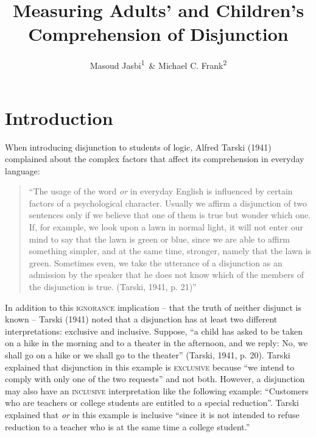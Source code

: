 \documentclass[,man,floatsintext]{apa6}
\title{Measuring Adults' and Children's Comprehension of Disjunction}
\author{Masoud Jasbi\textsuperscript{1}~\& Michael C. Frank\textsuperscript{2}}
\date{}
\affiliation{
\vspace{0.5cm}
\textsuperscript{1} Harvard University\\\textsuperscript{2} Stanford University}
\begin{document}
\maketitle

\hypertarget{introduction}{%
\section{Introduction}\label{introduction}}

When introducing disjunction to students of logic, Alfred Tarski (1941) complained about the complex factors that affect its comprehension in everyday language:

\begin{quote}
\enquote{The usage of the word \emph{or} in everyday English is influenced by certain factors of a psychological character. Usually we affirm a disjunction of two sentences only if we believe that one of them is true but wonder which one. If, for example, we look upon a lawn in normal light, it will not enter our mind to say that the lawn is green or blue, since we are able to affirm something simpler, and at the same time, stronger, namely that the lawn is green. Sometimes even, we take the utterance of a disjunction as an admission by the speaker that he does not know which of the members of the disjunction is true. (Tarski, 1941, p. 21)}
\end{quote}

In addition to this \textsc{ignorance} implication -- that the truth of neither disjunct is known -- Tarski (1941) noted that a disjunction has at least two different interpretations: exclusive and inclusive. Suppose, \enquote{a child has asked to be taken on a hike in the morning and to a theater in the afternoon, and we reply: No, we shall go on a hike or we shall go to the theater} (Tarski, 1941, p. 20). Tarski explained that disjunction in this example is \textsc{exclusive} because \enquote{we intend to comply with only one of the two requests} and not both. However, a disjunction may also have an \textsc{inclusive} interpretation like the following example: \enquote{Customers who are teachers or college students are entitled to a special reduction}. Tarski explained that \emph{or} in this example is inclusive \enquote{since it is not intended to refuse reduction to a teacher who is at the same time a college student.}
\end{document}
